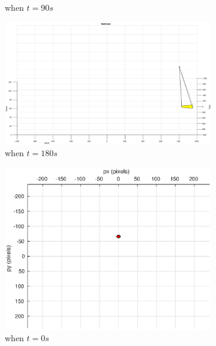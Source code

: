 \begin{figure}
\begin{subfigure}[b]{0.32\linewidth}
		\caption{when $t=90s$}
	\end{subfigure}
	\begin{subfigure}[b]{0.32\linewidth}
		\includegraphics[width=\textwidth]{images/chapter4/inertial_UAV_5mps_180s}
		\caption{when $t=180s$}
	\end{subfigure}
	\begin{subfigure}[b]{0.32\linewidth}
		\includegraphics[width=\textwidth]{images/chapter4/inertial_camera_5mps}
		\caption{when $t=0s$}
	\end{subfigure}
	\begin{subfigure}[b]{0.32\linewidth}

\end{subfigure}
\end{figure}
